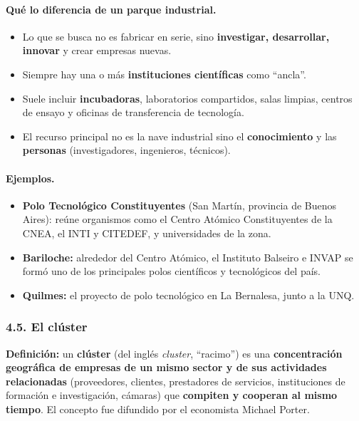 \paragraph*{Qué lo diferencia de un parque industrial.}
\begin{itemize}
  \item Lo que se busca no es fabricar en serie, sino \textbf{investigar, desarrollar,
        innovar} y crear empresas nuevas.
  \item Siempre hay una o más \textbf{instituciones científicas} como ``ancla''.
  \item Suele incluir \textbf{incubadoras}, laboratorios compartidos, salas limpias, centros de
        ensayo y oficinas de transferencia de tecnología.
  \item El recurso principal no es la nave industrial sino el \textbf{conocimiento} y las
        \textbf{personas} (investigadores, ingenieros, técnicos).
\end{itemize}

\paragraph*{Ejemplos.}
\begin{itemize}
  \item \textbf{Polo Tecnológico Constituyentes} (San Martín, provincia de Buenos Aires): reúne
        organismos como el Centro Atómico Constituyentes de la CNEA, el INTI y CITEDEF, y
        universidades de la zona.
  \item \textbf{Bariloche:} alrededor del Centro Atómico, el Instituto Balseiro e INVAP se
        formó uno de los principales polos científicos y tecnológicos del país.
  \item \textbf{Quilmes:} el proyecto de polo tecnológico en La Bernalesa, junto a la UNQ.
\end{itemize}

\subsubsection*{4.5. El clúster}

\begin{recuadro}
\textbf{Definición:} un \textbf{clúster} (del inglés \textit{cluster}, ``racimo'') es una
\textbf{concentración geográfica de empresas de un mismo sector y de sus actividades
relacionadas} (proveedores, clientes, prestadores de servicios, instituciones de formación e
investigación, cámaras) que \textbf{compiten y cooperan al mismo tiempo}. El concepto fue
difundido por el economista Michael Porter.
\end{recuadro}

